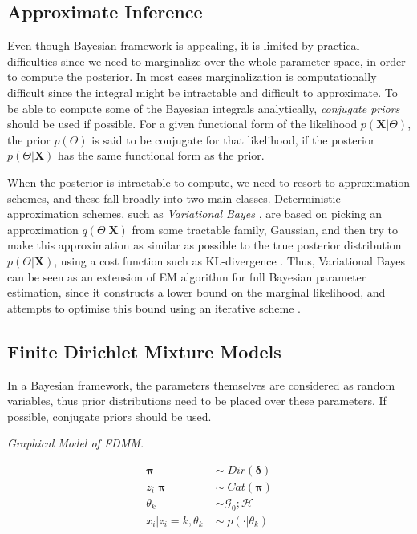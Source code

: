 \subsection{Approximate Inference}
Even though Bayesian framework is appealing, it is limited by practical difficulties since we need to marginalize over the whole parameter space, in order to compute the posterior. In most cases marginalization is computationally difficult since the integral might be intractable and difficult to approximate. To be able to compute some of the Bayesian integrals analytically, \emph{conjugate priors} should be used if possible. For a given functional form of the likelihood $p(\mathbf{X}|\Theta)$, the prior $p(\Theta)$ is said to be conjugate for that likelihood, if the posterior $p(\Theta|\mathbf{X})$ has the same functional form as the prior.

When the posterior is intractable to compute, we need to resort to approximation schemes, and these fall broadly into two main classes. Deterministic approximation schemes, such as \emph{Variational Bayes} \citep{Beal2003}, are based on picking an approximation $q(\Theta|\mathbf{X})$ from some tractable family, \eg Gaussian, and then try to make this approximation as similar as possible to the true posterior distribution $p(\Theta|\mathbf{X})$, using a cost function such as KL-divergence \cite[Ch. 21]{Murphy2012}. Thus, Variational Bayes can be seen as an extension of EM algorithm for full Bayesian parameter estimation, since it constructs a lower bound on the marginal likelihood, and attempts to optimise this bound using an iterative scheme \citep{Beal2003}.



\subsection{Finite Dirichlet Mixture Models}
In a Bayesian framework, the parameters themselves are considered as random variables, thus prior distributions need to be placed over these parameters. If possible, conjugate priors should be used.

 

\begin{minipage}{0.6\textwidth}%
  \hfill
  \begin{center}
	
	\emph{Graphical Model of FDMM.}
  \end{center}
\end{minipage}
\begin{minipage}{0.1\textwidth}%
  \begin{equation*}
  	\begin{aligned}
  		\mathbf{\pi} \; & \sim \; Dir(\mathbf{\delta}) \\
  		z_{i}|\mathbf{\pi} \; & \sim \; Cat(\mathbf{\pi}) \\
  		\theta_{k} \; & \sim \mathcal{G}_{0}; \mathcal{H} \\
  		x_{i}|z_{i}=k,\theta_{k} \; & \sim \; p(\cdot | \theta_{k})  
  	\end{aligned} 
  \end{equation*} 
\end{minipage}

